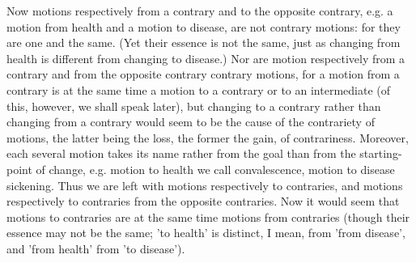 Now motions respectively from a contrary and to the opposite contrary,
e.g. a motion from health and a motion to disease, are not contrary
motions: for they are one and the same. (Yet their essence is not
the same, just as changing from health is different from changing
to disease.) Nor are motion respectively from a contrary and from
the opposite contrary contrary motions, for a motion from a contrary
is at the same time a motion to a contrary or to an intermediate (of
this, however, we shall speak later), but changing to a contrary rather
than changing from a contrary would seem to be the cause of the contrariety
of motions, the latter being the loss, the former the gain, of contrariness.
Moreover, each several motion takes its name rather from the goal
than from the starting-point of change, e.g. motion to health we call
convalescence, motion to disease sickening. Thus we are left with
motions respectively to contraries, and motions respectively to contraries
from the opposite contraries. Now it would seem that motions to contraries
are at the same time motions from contraries (though their essence
may not be the same; 'to health' is distinct, I mean, from 'from disease',
and 'from health' from 'to disease'). 

